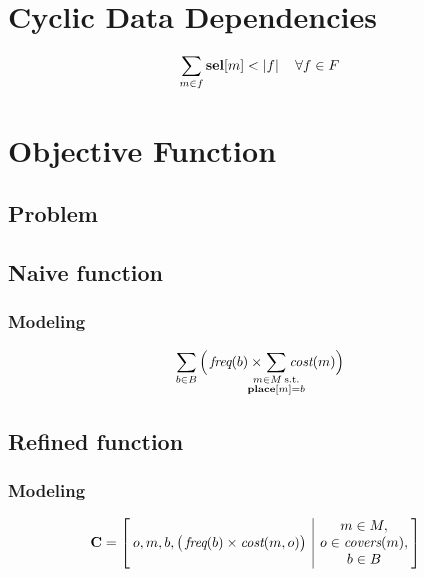 \section{Cyclic Data Dependencies}

\begin{equation}
  \sum_{m \in f} \mVar{sel}[m] < \mCard{f}
  \mQuantSep
  \forall f \in \mForbiddenCombSet
  \labelEquation{cyclic-data-deps}
\end{equation}

\section{Objective Function}
\subsection{Problem}
\subsection{Naive function}
\subsubsection{Modeling}

\begin{equation}
  \sum_{b \in \mBlockSet}
  \Big(
    \mFreq(b) \times
    \hspace{-4.5mm}
    \sum_{
      \substack{
        m \in \mMatchSet \:\text{s.t.} \\
        \mVar{place}[m] = b
      }
    }
     \hspace{-4.5mm}
    \mCost(m)
  \Big)
  \labelEquation{naive-objective-function}
\end{equation}

\subsection{Refined function}
\subsubsection{Modeling}

\begin{equation}
  \hspace*{-2mm} %
  \mCostMatrix =
  \begin{bmatrix}
    \begin{array}{@{\:}c|c@{\:}}
        o, m, b, \big( \mFreq(b) \times \mOpCost(m, o) \big)
      & \begin{array}{@{}c@{}}
          m \in \mMatchSet, \\
          o \in \mCovers(m), \\
          b \in \mBlockSet \\
        \end{array}
    \end{array}
  \end{bmatrix}
  \labelEquation{cost-matrix}
\end{equation}

